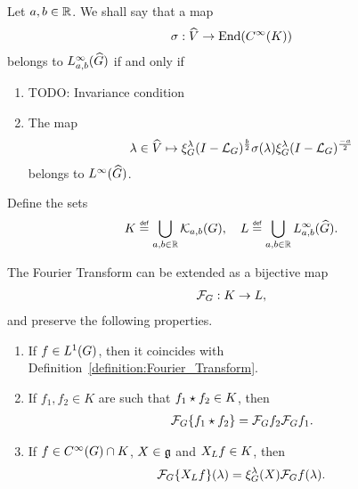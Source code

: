 \begin{definition}
    Let $a, b \in \R$.
    We shall say that a map
    \begin{align*}
        \sigma : \dualGroup\VectorSpace \to \End(\SmoothFunctions{\CompactGroup})
    \end{align*}
    belongs to $\LebesgueDual[a, b]{\infty}{\Group}$ if and only if
    \begin{enumerate}
        \item TODO: Invariance condition
        \item The map
            \begin{align*}
                \lambda \in \dualGroup\VectorSpace \mapsto
                \Rep\lambda \BesselPotential{b} \sigma(\lambda) \Rep\lambda \BesselPotential{-a}
            \end{align*}
            belongs to $\LebesgueDual{\infty}{\Group}$.
    \end{enumerate}
\end{definition}

\begin{proposition}
    Define the sets
    \begin{align*}
        K \defeq \bigcup_{a, b \in \R} \KernelsSobolev{a}{b}, \quad
        L \defeq \bigcup_{a, b \in \R} \LebesgueDual[a, b]{\infty}{\Group}.
    \end{align*}

    The Fourier Transform can be extended as a bijective map
    \begin{align*}
        \Fourier : K \to L,
    \end{align*}
    and preserve the following properties.
    \begin{enumerate}
        \item If $f \in \Lebesgue{1}{\Group}$, then it coincides with Definition~\ref{definition:Fourier_Transform}.
        \item If $f_1, f_2 \in K$ are such that $\conv{f_1}{f_2} \in K$, then
            \begin{align*}
                \Fourier\{\conv{f_1}{f_2}\} = \Fourier f_2 \Fourier f_1.
            \end{align*}
        \item If $f \in \SmoothFunctions{\Group} \cap K$, $X \in \LieAlgebra$ and $\LeftDifferentialOperatorFirstOrder{X} f \in K$, then
            \begin{align*}
                \Fourier\{\LeftDifferentialOperatorFirstOrder{X} f\}(\lambda) = \Rep\lambda(X) \Fourier f(\lambda).
            \end{align*}
    \end{enumerate}
\end{proposition}

